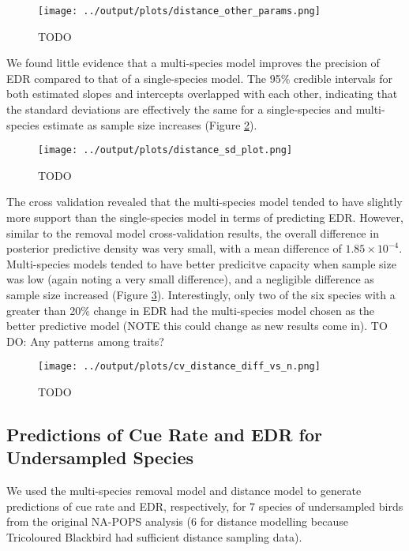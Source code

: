 \documentclass[12pt]{article}
\begin{document}
\begin{figure}[h!]
	\texttt{[image: ../output/plots/distance\_other\_params.png]}
	\caption{TODO}
	\label{fig:distance_params}
\end{figure}

\par We found little evidence that a multi-species model improves the precision of EDR compared to that of a single-species model.
The 95\% credible intervals for both estimated slopes and intercepts overlapped with each other, indicating that the standard deviations are effectively the same for a single-species and multi-species estimate as sample size increases (Figure \ref{fig:distance_sd}).

\begin{figure}[h!]
	\texttt{[image: ../output/plots/distance\_sd\_plot.png]}
	\caption{TODO}
	\label{fig:distance_sd}
\end{figure}

\par The cross validation revealed that the multi-species model tended to have slightly more support than the single-species model in terms of predicting EDR.
However, similar to the removal model cross-validation results, the overall difference in posterior predictive density was very small, with a mean difference of $1.85 \times 10^{-4}$.
Multi-species models tended to have better predicitve capacity when sample size was low (again noting a very small difference), and a negligible difference as sample size increased (Figure \ref{fig:distance_cv}).
Interestingly, only two of the six species with a greater than 20\% change in EDR had the multi-species model chosen as the better predictive model (NOTE this could change as new results come in).
TO DO: Any patterns among traits?

\begin{figure}[h!]
	\texttt{[image: ../output/plots/cv\_distance\_diff\_vs\_n.png]}
	\caption{TODO}
	\label{fig:distance_cv}
\end{figure}

\subsection{Predictions of Cue Rate and EDR for Undersampled Species}

\par We used the multi-species removal model and distance model to generate predictions of cue rate and EDR, respectively, for 7 species of undersampled birds from the original NA-POPS analysis (6 for distance modelling because Tricoloured Blackbird had sufficient distance sampling data).
\end{document}
